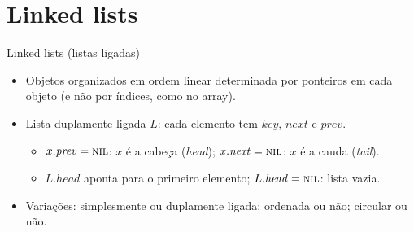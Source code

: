 \documentclass[aspectratio=169,10pt]{beamer}
\newcommand{\NIL}{\textnormal{\rmfamily\textsc{nil}}}
\newcommand{\at}[1]{.\mathit{#1}}
\newcommand{\llnode}[4][]{%
  \node[ll,#1] (#2) at (#3)
    {\nodepart{one}\hspace{2mm}\nodepart{two}\makebox[4.5mm]{#4}%
     \nodepart{three}\hspace{2mm}};}
\newcommand{\llnext}[3][black]{%
  \draw[ptrdot, draw=#1] ($(#2.two split)!0.5!(#2.east)+(0,0.08)$)
     -- ($(#3.west)+(0,0.08)$);}
\newcommand{\llprev}[3][black]{%
  \draw[ptrdot, draw=#1] ($(#3.west)!0.5!(#3.one split)+(0,-0.08)$)
     -- ($(#2.east)+(0,-0.08)$);}
\newcommand{\lllink}[3][black]{\llnext[#1]{#2}{#3}\llprev[#1]{#2}{#3}}
\newcommand{\llnilnext}[1]{\draw[thick] (#1.two split south) -- (#1.north east);}
\newcommand{\llnilprev}[1]{\draw[thick] (#1.south west) -- (#1.one split north);}
\begin{document}
\section{Linked lists}

\begin{frame}{Linked lists (listas ligadas)}
  \begin{itemize}
    \item Objetos organizados em ordem linear determinada por \alert{ponteiros} em cada
          objeto (e não por índices, como no array).
    \item Lista \alert{duplamente ligada} $L$: cada elemento tem $key$, $next$ e $prev$.
      \begin{itemize}
        \item $x\at{prev}=\NIL$: $x$ é a \alert{cabeça} (\emph{head});
              $x\at{next}=\NIL$: $x$ é a \alert{cauda} (\emph{tail}).
        \item $L\at{head}$ aponta para o primeiro elemento; $L\at{head}=\NIL$: lista vazia.
      \end{itemize}
    \item Variações: simplesmente ou duplamente ligada; ordenada ou não; circular ou não.
  \end{itemize}
  \centering
\end{frame}
\end{document}
